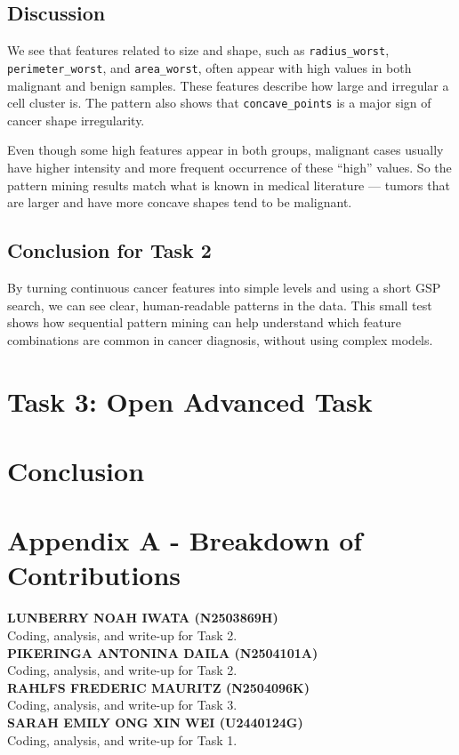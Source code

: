 \documentclass[12pt]{article}
\begin{document}
\subsection{Discussion}
We see that features related to size and shape, such as \texttt{radius\_worst}, \texttt{perimeter\_worst}, and \texttt{area\_worst}, often appear with high values in both malignant and benign samples. 
These features describe how large and irregular a cell cluster is. 
The pattern also shows that \texttt{concave\_points} is a major sign of cancer shape irregularity. 

Even though some high features appear in both groups, malignant cases usually have higher intensity and more frequent occurrence of these “high” values. 
So the pattern mining results match what is known in medical literature — tumors that are larger and have more concave shapes tend to be malignant.

\subsection{Conclusion for Task 2}
By turning continuous cancer features into simple levels and using a short GSP search, we can see clear, human-readable patterns in the data. 
This small test shows how sequential pattern mining can help understand which feature combinations are common in cancer diagnosis, without using complex models.

\pagebreak
\section{Task 3: Open Advanced Task}

\pagebreak
\section{Conclusion} %

\pagebreak
\section*{Appendix A - Breakdown of Contributions}
\renewcommand{\thepage}{A-\arabic{page}}

\textbf{LUNBERRY NOAH IWATA (N2503869H)} \\
Coding, analysis, and write-up for Task 2. \\

\textbf{PIKERINGA ANTONINA DAILA (N2504101A)} \\
Coding, analysis, and write-up for Task 2. \\

\textbf{RAHLFS FREDERIC MAURITZ (N2504096K)} \\
Coding, analysis, and write-up for Task 3. \\

\textbf{SARAH EMILY ONG XIN WEI (U2440124G)} \\
Coding, analysis, and write-up for Task 1. \\
\end{document}
